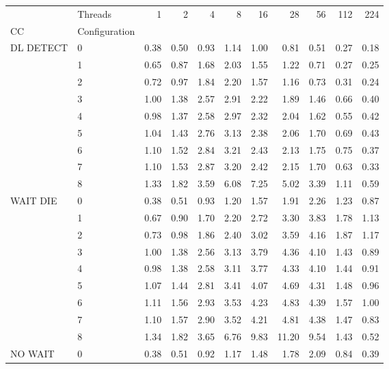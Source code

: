 \begin{tabular}{llrrrrrrrrr}
\toprule
       & Threads &  1   &  2   &  4   &  8   &   16  &   28  &   56  &  112 &  224 \\
CC & Configuration &      &      &      &      &       &       &       &      &      \\
\midrule
DL DETECT & 0 & 0.38 & 0.50 & 0.93 & 1.14 &  1.00 &  0.81 &  0.51 & 0.27 & 0.18 \\
       & 1 & 0.65 & 0.87 & 1.68 & 2.03 &  1.55 &  1.22 &  0.71 & 0.27 & 0.25 \\
       & 2 & 0.72 & 0.97 & 1.84 & 2.20 &  1.57 &  1.16 &  0.73 & 0.31 & 0.24 \\
       & 3 & 1.00 & 1.38 & 2.57 & 2.91 &  2.22 &  1.89 &  1.46 & 0.66 & 0.40 \\
       & 4 & 0.98 & 1.37 & 2.58 & 2.97 &  2.32 &  2.04 &  1.62 & 0.55 & 0.42 \\
       & 5 & 1.04 & 1.43 & 2.76 & 3.13 &  2.38 &  2.06 &  1.70 & 0.69 & 0.43 \\
       & 6 & 1.10 & 1.52 & 2.84 & 3.21 &  2.43 &  2.13 &  1.75 & 0.75 & 0.37 \\
       & 7 & 1.10 & 1.53 & 2.87 & 3.20 &  2.42 &  2.15 &  1.70 & 0.63 & 0.33 \\
       & 8 & 1.33 & 1.82 & 3.59 & 6.08 &  7.25 &  5.02 &  3.39 & 1.11 & 0.59 \\
WAIT DIE & 0 & 0.38 & 0.51 & 0.93 & 1.20 &  1.57 &  1.91 &  2.26 & 1.23 & 0.87 \\
       & 1 & 0.67 & 0.90 & 1.70 & 2.20 &  2.72 &  3.30 &  3.83 & 1.78 & 1.13 \\
       & 2 & 0.73 & 0.98 & 1.86 & 2.40 &  3.02 &  3.59 &  4.16 & 1.87 & 1.17 \\
       & 3 & 1.00 & 1.38 & 2.56 & 3.13 &  3.79 &  4.36 &  4.10 & 1.43 & 0.89 \\
       & 4 & 0.98 & 1.38 & 2.58 & 3.11 &  3.77 &  4.33 &  4.10 & 1.44 & 0.91 \\
       & 5 & 1.07 & 1.44 & 2.81 & 3.41 &  4.07 &  4.69 &  4.31 & 1.48 & 0.96 \\
       & 6 & 1.11 & 1.56 & 2.93 & 3.53 &  4.23 &  4.83 &  4.39 & 1.57 & 1.00 \\
       & 7 & 1.10 & 1.57 & 2.90 & 3.52 &  4.21 &  4.81 &  4.38 & 1.47 & 0.83 \\
       & 8 & 1.34 & 1.82 & 3.65 & 6.76 &  9.83 & 11.20 &  9.54 & 1.43 & 0.52 \\
NO WAIT & 0 & 0.38 & 0.51 & 0.92 & 1.17 &  1.48 &  1.78 &  2.09 & 0.84 & 0.39 \\

\end{tabular}
